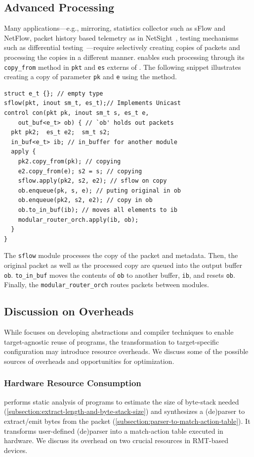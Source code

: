 \documentclass[letterpaper,twocolumn,10pt]{article}
\begin{document}
\subsection{Advanced Processing}
Many applications---e.g., mirroring, statistics collector such as
sFlow and NetFlow, packet history based telemetry as in
NetSight~\cite{179783}, testing mechanisms such as differential
testing~\cite{Zheng:2018:PLV:3281411.3281436}---require selectively
creating copies of packets and processing the copies in a different
manner. \ulang enables such processing through its \texttt{copy\_from}
method in \texttt{pkt} and \texttt{es} externs of \uarch. The
following snippet illustrates creating a copy of parameter \texttt{pk}
and \texttt{e} using the method.
\begin{lstlisting}[frame=none]
struct e_t {}; // empty type
sflow(pkt, inout sm_t, es_t);// Implements Unicast 
control con(pkt pk, inout sm_t s, es_t e, 
    out_buf<e_t> ob) { // `ob' holds out packets
  pkt pk2;  es_t e2;  sm_t s2;
  in_buf<e_t> ib; // in_buffer for another module
  apply {
    pk2.copy_from(pk); // copying
    e2.copy_from(e); s2 = s; // copying
    sflow.apply(pk2, s2, e2); // sflow on copy
    ob.enqueue(pk, s, e); // puting original in ob
    ob.enqueue(pk2, s2, e2); // copy in ob
    ob.to_in_buf(ib); // moves all elements to ib
    modular_router_orch.apply(ib, ob);
  }
}
\end{lstlisting}
The \texttt{sflow} module processes the copy of the packet and
metadata.  Then, the original packet as well as the processed copy are
queued into the output buffer \texttt{ob}. \texttt{to\_in\_buf} moves
the contents of \texttt{ob} to another buffer, \texttt{ib}, and resets
\texttt{ob}. Finally, the \texttt{modular\_router\_orch} routes
packets between modules.





\subsection{Discussion on Overheads}
While \ulang focuses on developing abstractions and compiler
techniques to enable target-agnostic reuse of programs, the
transformation to target-specific configuration may introduce resource
overheads. We discuss some of the possible sources of overheads and
opportunities for optimization.

\subsubsection{Hardware Resource Consumption}
\ucomp performs static analysis of \ulang programs to estimate the
size of byte-stack needed
(\cref{subsection:extract-length-and-byte-stack-size}) and synthesizes
a (de)parser to extract/emit bytes from the packet
(\cref{subsection:parser-to-match-action-table}). It transforms
user-defined (de)parser into a match-action table executed in
hardware. We discuss its overhead on two crucial resources in
RMT-based devices.
\end{document}
